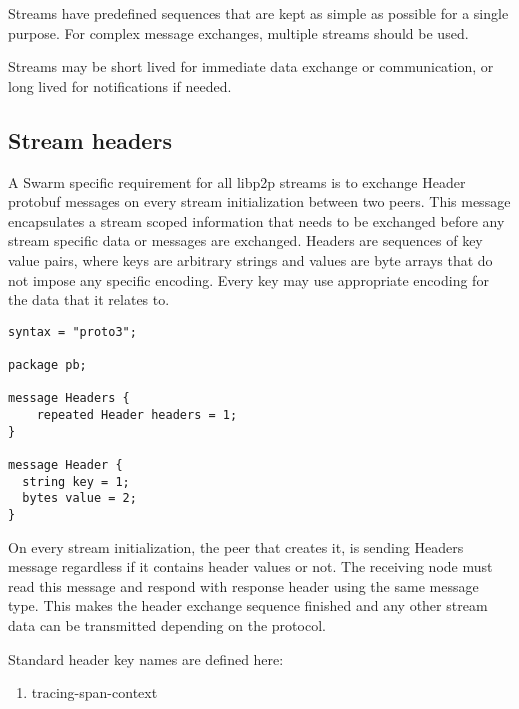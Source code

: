 Streams have predefined sequences that are kept as simple as possible for a single purpose. For complex message exchanges, multiple streams should be used.

Streams may be short lived for immediate data exchange or communication, or long lived for notifications if needed.

\subsection{Stream headers}

A Swarm specific requirement for all libp2p streams is to exchange Header protobuf messages on every stream initialization between two peers. This message encapsulates a stream scoped information that needs to be exchanged before any stream specific data or messages are exchanged. Headers are sequences of key value pairs, where keys are arbitrary strings and values are byte arrays that do not impose any specific encoding. Every key may use appropriate encoding for the data that it relates to.

\begin{definition}\label{def:headers-message}

\begin{lstlisting}[language=protobuf3]
syntax = "proto3";

package pb;

message Headers {
    repeated Header headers = 1;
}

message Header {
  string key = 1;
  bytes value = 2;
}
\end{lstlisting}
\end{definition}

On every stream initialization, the peer that creates it, is sending Headers message regardless if it contains header values or not. The receiving node must read this message and respond with response header using the same message type. This makes the header exchange sequence finished and any other stream data can be transmitted depending on the protocol.

Standard header key names are defined here:

\begin{enumerate}
\item tracing-span-context
\end{enumerate}